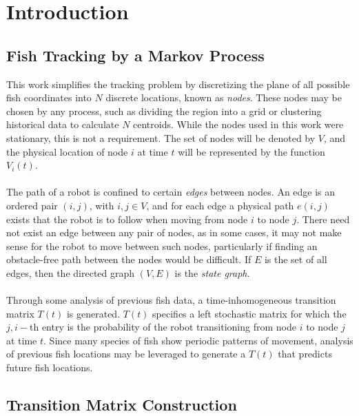 \documentclass[11pt,letterpaper]{article}
\author{Kevin Smith}
\begin{document}
	
	\section{Introduction}
	
	\subsection{Fish Tracking by a Markov Process}
	
	This work simplifies the tracking problem by discretizing the plane of all possible fish coordinates into $N$ discrete locations, known as \textit{nodes}. These nodes may be chosen by any process, such as dividing the region into a grid or clustering historical data to calculate $N$ centroids. While the nodes used in this work were stationary, this is not a requirement. The set of nodes will be denoted by $V$, and the physical location of node $i$ at time $t$ will be represented by the function $V_i(t)$.
	\\\\
	The path of a robot is confined to certain \textit{edges} between nodes. An edge is an ordered pair $(i, j)$, with $i, j \in V$, and for each edge a physical path $e(i, j)$ exists that the robot is to follow when moving from node $i$ to node $j$. There need not exist an edge between any pair of nodes, as in some cases, it may not make sense for the robot to move between such nodes, particularly if finding an obstacle-free path between the nodes would be difficult. If $E$ is the set of all edges, then the directed graph $(V, E)$ is the \textit{state graph}.
	\\\\
	Through some analysis of previous fish data, a time-inhomogeneous transition matrix $T(t)$ is generated. $T(t)$ specifies a left stochastic matrix for which the $j, i-$th entry is the probability of the robot transitioning from node $i$ to node $j$ at time $t$. Since many species of fish show periodic patterns of movement, analysis of previous fish locations may be leveraged to generate a $T(t)$ that predicts future fish locations.
	
	\subsection{Transition Matrix Construction}
	
\end{document}

